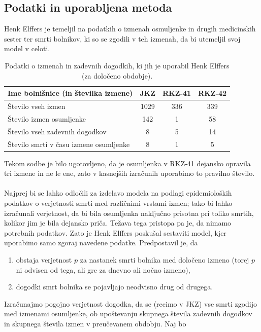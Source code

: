 \documentclass[fin1, tisk]{fmfdelo}
\theoremstyle{definition} %
\theoremstyle{trditev} %
\theoremstyle{izrek}
\begin{document}
\subsection{Podatki in uporabljena metoda}
Henk Elffers je temeljil na podatkih o izmenah osmuljenke in drugih medicinskih sester ter smrti bolnikov, ki so se zgodili v teh izmenah, da bi 
utemeljil svoj model v celoti.
\begin{table}[h!]
    \centering
    \caption{Podatki o izmenah in zadevnih dogodkih, ki jih je uporabil Henk Elffers (za določeno obdobje).}
    \label{table:1}
     \begin{tabular}{l c c c}
        \hline
        Ime bolnišnice (in številka izmene) & JKZ  & RKZ-41 & RKZ-42 \\ 
        \hline
        Število vseh izmen & 1029 & 336 & 339 \\
        Število izmen osumljenke & 142 & 1 & 58 \\
        Število vseh zadevnih dogodkov & 8 & 5 & 14 \\
        Število smrti v času izmene osumljenke & 8 & 1 & 5 \\
        \hline
     \end{tabular}
 \end{table}
Tekom sodbe je bilo ugotovljeno, da je osumljenka v RKZ-41 dejansko opravila tri izmene in ne le ene, zato v kasnejših izračunih uporabimo to 
pravilno število.\\\\
Najprej bi se lahko odločili za izdelavo modela na podlagi epidemioloških podatkov o verjetnosti smrti med različnimi vrstami izmen; 
tako bi lahko izračunali verjetnost, da bi bila osumljenka naključno prisotna pri toliko smrtih, kolikor jim je bila dejansko priča. Težava 
tega pristopa pa je, da nimamo potrebnih podatkov. Zato je Henk Elffers poskušal sestaviti model, kjer uporabimo samo zgoraj navedene podatke. Predpostavil 
je, da
\begin{enumerate}
    \item obstaja verjetnost $p$ za nastanek smrti bolnika med določeno izmeno (torej $p$ ni odvisen od tega, ali gre za dnevno ali nočno izmeno),
    \item dogodki smrt bolnika se pojavljajo neodvisno drug od drugega.
\end{enumerate}
Izračunajmo pogojno verjetnost dogodka, da se (recimo v JKZ) vse smrti zgodijo med izmenami osumljenke, ob upoštevanju skupnega števila 
zadevnih dogodkov in skupnega števila izmen v preučevanem obdobju. Naj bo\\
\end{document}
